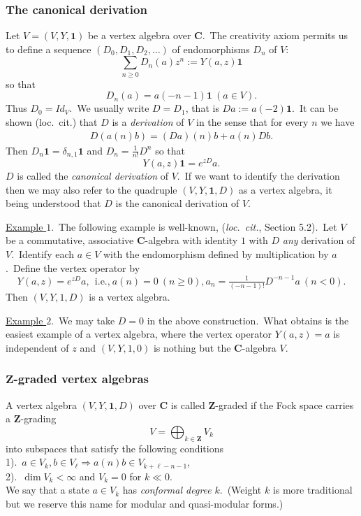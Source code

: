 \documentclass[12pt]{amsart}
\theoremstyle{plain}
\theoremstyle{definition}
\theoremstyle{remark}
\newcommand{\CC}{\mathbf{C}}
\newcommand{\ZZ}{\mathbf{Z}}
\begin{document}
\subsubsection{The canonical derivation}\label{SScanonical}
Let $V= (V, Y, \mathbf{1})$ be a vertex algebra over $\CC$.\ The creativity axiom permits us to define a sequence $(D_0, D_1, D_2, \hdots)$ of endomorphisms $D_n$ of $V$:
$$\sum_{n\geq0} D_n(a)z^n :=Y(a, z)\mathbf{1}$$
so that
$$D_{n}(a)= a(-n-1)\mathbf{1}\ (a\in V).$$
Thus $D_0=Id_V$.\ We usually write $D=D_1$, that is $Da:=a(-2)\mathbf{1}$.\ It can be shown (loc.\ cit.) that $D$ is a \textit{derivation} of $V$ in the sense that
for every $n$ we have
\begin{eqnarray}\label{derdef}
D(a(n)b)= (Da)(n)b+a(n)Db.
\end{eqnarray}
 Then  $D_n\mathbf{1}=\delta_{n, 1}\mathbf{1}$ and $D_n=\frac{1}{n!}D^n$ so that
$$Y(a, z)\mathbf{1}=e^{zD}a.$$
$D$ is called the \textit{canonical derivation} of $V$.\ If we want to identify the derivation then we may also refer to the quadruple $(V, Y,\mathbf{1}, D)$ as a vertex algebra, it being understood that $D$ is the canonical derivation of $V$.

\medskip\noindent
\underline{Example $1$}.\ The following example is well-known, (\textit{loc.\ cit.}, Section 5.2).\ Let $V$ be a commutative, associative $\CC$-algebra with identity $1$ with $D$  \textit{any} derivation of $V$.\ Identify each $a\in V$ with the endomorphism defined by multiplication by $a$.\ Define the vertex operator by
$$Y(a, z)=e^{zD}a,\ \ \mbox{i.e.,}\ a(n)=0\ (n\geq0), a_n=\tfrac{1}{(-n-1)!}D^{-n-1}a\ (n<0).$$
Then $(V, Y, 1, D)$ is a vertex algebra.

\medskip\noindent
\underline{Example $2$}.\ We may take $D=0$ in the above construction.\ What obtains is the easiest example of a vertex algebra, where the vertex operator $Y(a, z)=a$
is independent of $z$ and  $(V, Y, 1, 0)$ is nothing but the $\CC$-algebra $V$.

\subsubsection{$\ZZ$-graded vertex algebras}\label{SSgr}  A vertex algebra $(V, Y, \mathbf{1}, D)$ over $\CC$ is called $\ZZ$-graded if the Fock space carries a $\ZZ$-grading
$$V = \bigoplus_{k\in \ZZ} V_k$$ into subspaces that satisfy the following conditions\\
1).\ $a\in V_k, b\in V_{\ell}\Rightarrow a(n)b\in V_{k+\ell-n-1}$, \\
2).\ $\dim V_k<\infty$ and $V_k=0$ for $k\ll0$.\\
We say that a state $a\in V_k$ has \textit{conformal degree} $k$.\ (Weight $k$ is more traditional but we reserve this name for modular and quasi-modular forms.)
\end{document}
